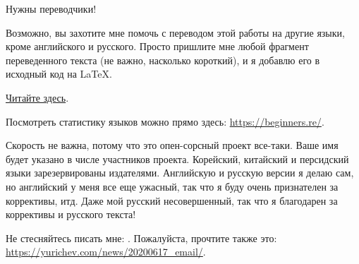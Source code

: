 \vspace*{\fill}

\Huge Нужны переводчики!
\normalsize

\bigskip
\bigskip
\bigskip

Возможно, вы захотите мне помочь с переводом этой работы на другие языки, кроме английского и русского.
Просто пришлите мне любой фрагмент переведенного текста (не важно, насколько короткий), и я добавлю его в исходный код на LaTeX.

\href{\RepoURL/Translation.md}{Читайте здесь}.

Посмотреть статистику языков можно прямо здесь: \url{https://beginners.re/}.

Скорость не важна, потому что это опен-сорсный проект все-таки.
Ваше имя будет указано в числе участников проекта.
Корейский, китайский и персидский языки зарезервированы издателями.
Английскую и русскую версии я делаю сам, но английский у меня все еще ужасный, так что я буду очень признателен за коррективы, итд.
Даже мой русский несовершенный, так что я благодарен за коррективы и русского текста!

Не стесняйтесь писать мне: \GTT{\EMAILS}.
Пожалуйста, прочтите также это: \url{https://yurichev.com/news/20200617_email/}.

\vspace*{\fill}
\vfill
